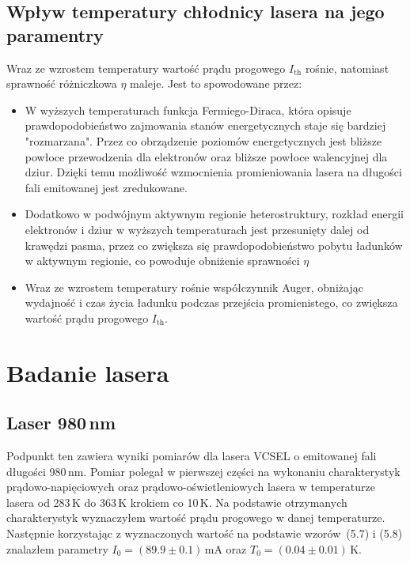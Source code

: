 \documentclass[a4paper, portrait,12pt]{mwrep}
\begin{document}
\subsection{Wpływ temperatury chłodnicy lasera na jego paramentry}
Wraz ze wzrostem temperatury wartość prądu progowego $I_{\mathrm{th}}$ rośnie, natomiast sprawność różniczkowa $\eta$ maleje. Jest to spowodowane przez:
\begin{itemize}
\item W wyższych temperaturach funkcja Fermiego-Diraca, która opisuje prawdopodobieństwo zajmowania stanów energetycznych staje się bardziej "rozmarzana". Przez co obrządzenie poziomów energetycznych jest bliższe powłoce przewodzenia dla elektronów oraz bliższe powłoce walencyjnej dla dziur. Dzięki temu możliwość wzmocnienia promieniowania lasera na długości fali emitowanej jest zredukowane.
\item Dodatkowo w podwójnym aktywnym regionie heterostruktury, rozkład energii elektronów i dziur w wyższych temperaturach jest przesunięty dalej od krawędzi pasma, przez co zwiększa się prawdopodobieństwo pobytu ładunków w aktywnym regionie, co powoduje obniżenie sprawności $\eta$
\item Wraz ze wzrostem temperatury rośnie współczynnik Auger, obniżając wydajność i czas życia ładunku podczas przejścia promienistego, co zwiększa wartość prądu progowego $I_{\mathrm{th}}$.


\end{itemize}
\newpage








\section{Badanie lasera}
\subsection{Laser 980\,nm}
Podpunkt ten zawiera wyniki pomiarów dla lasera VCSEL o emitowanej fali długości 980\,nm.
Pomiar polegał w pierwszej części na wykonaniu charakterystyk prądowo-napięciowych
oraz prądowo-oświetleniowych lasera w temperaturze lasera od 283\,K do 363\,K krokiem co 10\,K.
Na podstawie otrzymanych charakterystyk wyznaczyłem wartość prądu progowego w danej temperaturze.
Następnie korzystając z wyznaczonych wartość na podstawie wzorów~(5.7) i (5.8) znalazłem
parametry $I_{0} = (89.9 \pm 0.1)$\,mA oraz $T_0 = (0.04 \pm 0.01)$\,K.
\end{document}
